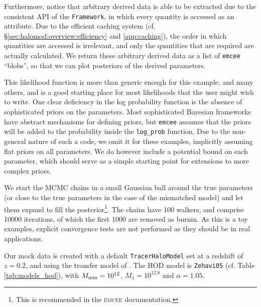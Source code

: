 \documentclass[5p,aas_macros]{elsarticle}
\newcommand{\framework}{\texttt{Framework}\xspace} %
\begin{document}
Furthermore, notice that arbitrary derived data is able to be extracted due to the consistent API of the \framework, in which every quantity is accessed as an attribute. 
Due to the efficient caching system (cf. \S\ref{sec:halomod:overview:efficiency} and \ref{app:caching}), the order in which quantities are accessed is irrelevant, and only the quantities that are required are actually calculated.
We return these arbitrary derived data as a list of \verb|emcee| ``blobs'', so that we can plot posteriors of the derived parameters.

This likelihood function is more than generic enough for this example, and many others, and is a good starting place for most likelihoods that the user might wish to write.
One clear deficiency in the log probability function is the absence of sophisticated priors on the parameters. 
Most sophisticated Bayesian frameworks have abstract mechanisms for defining priors, but \verb|emcee| assumes that the priors will be added to the probability inside the \verb|log_prob| function. 
Due to the non-general nature of such a code, we omit it for these examples, implicitly assuming flat priors on all parameters. 
We do however include a potential bound on each parameter, which should serve as a simple starting point for extensions to more complex priors.

We start the MCMC chains in a small Gaussian ball around the true parameters (or close to the true parameters in the case of the mismatched model) and let them expand to fill the posterior\footnote{This is recommended in the \textsc{emcee} documentation.}. 
The chains have 100 walkers, and comprise 10000 iterations, of which the first 1000 are removed as burnin. 
As this is a toy examples, explicit convergence tests are not performed as they should be in real applications. 


Our mock data is created with a default \texttt{Tracer\-Halo\-Model} set at a redshift of $z=0.2$, and using the transfer model of \citet{Eisenstein1998}. The HOD model is \verb|Zehavi05| (cf. Table \ref{tab:models_hod}), with $M_{\rm min} = 10^{12}$, $M_1 = 10^{12.8}$ and $\alpha = 1.05$.
\end{document}
